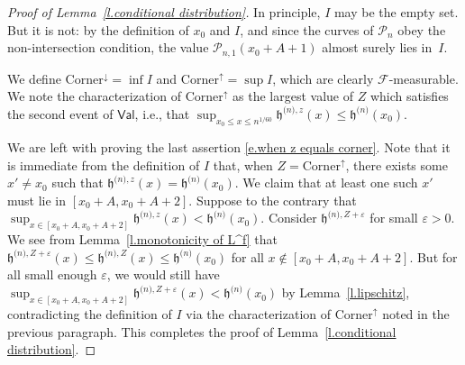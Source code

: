 \documentclass[oneside,final,11pt]{amsart}
\theoremstyle{definition}
\newcommand{\Lsc}{\CP_n}
\newcommand{\Corner}{\mathrm{Corner}}
\renewcommand{\L}{\CP}
\newcommand{\fh}{\mathfrak{h}}
\newcommand{\h}{\fh^{{\scriptscriptstyle(}n{\scriptscriptstyle)}}}
\newcommand{\hz}[1]{\fh^{{\scriptscriptstyle(}n{\scriptscriptstyle)},#1}}
\newcommand{\R}{\mathbb{R}}
\newcommand{\1}[1]{\mathbf{1}_{#1}}
\newcommand{\F}{\mathscr{F}}
\newcommand{\CP}{\mathcal{P}}
\numberwithin{equation}{section}
\begin{document}
\begin{proof}[Proof of Lemma~\ref{l.conditional distribution}]
In principle, $I$ may be the empty set. But it is not: by the definition of $x_0$ and $I$, and since the curves of $\L_n$ obey the non-intersection condition, the value $\L_{n,1}(x_0+A+1)$ almost surely lies in~$I$.

We define $\Corner^{\downarrow} = \inf I$ and $\Corner^{\uparrow} = \sup I$, which are clearly $\F$-measurable. We note the characterization of $\Corner^{\uparrow}$ as the largest value of $Z$ which satisfies the second event of $\mathsf{Val}$, i.e., that $\sup_{x_0\leq x \leq n^{1/60}}\hz{z}(x) \leq \h(x_0)$.

We are left with proving the last assertion \eqref{e.when z equals corner}. Note that it is immediate from the definition of $I$ that, when $Z=\Corner^{\uparrow}$, there exists some $x'\neq x_0$ such that $\hz{z}(x) = \h(x_0)$. We claim that at least one such $x'$ must lie in $[x_0+A,x_0+A+2]$. Suppose to the contrary that $\sup_{x\in [x_0+A,x_0+A+2]} \hz{z}(x) < \h(x_0)$. Consider $\hz{Z+\varepsilon}$ for small $\varepsilon>0$. We see from Lemma~\ref{l.monotonicity of L^f} that $\hz{Z+\varepsilon}(x) \leq \hz{Z}(x) \leq \h(x_0)$ for all $x\not\in [x_0+A,x_0+A+2]$. But for all small enough $\varepsilon$, we would still have $\sup_{x\in [x_0+A,x_0+A+2]} \hz{Z+\varepsilon}(x) < \h(x_0)$ by Lemma~\ref{l.lipschitz}, contradicting the definition of $I$ via the characterization of $\Corner^{\uparrow}$ noted in the previous paragraph. This completes the proof of Lemma~\ref{l.conditional distribution}.
\end{proof}




\end{document}
